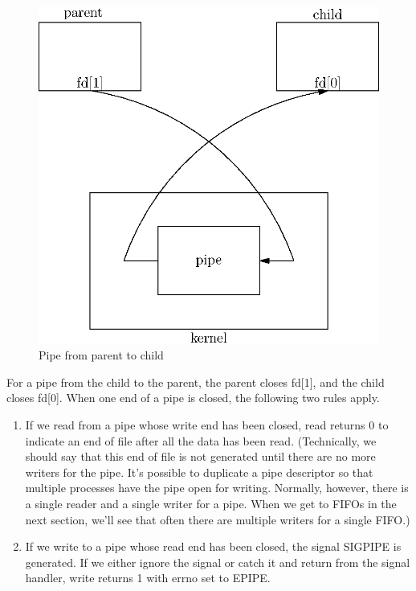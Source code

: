 \begin{figure}[h!]
	\includegraphics[width=\linewidth]{04IpcFifoReader/sample_box.eps}
	\caption{Pipe from parent to child}
\end{figure}
For a pipe from the child to the parent, the parent closes fd[1], and the child closes fd[0]. When one end of a pipe is closed, the following two rules apply.

\begin{enumerate}
	\item If we read from a pipe whose write end has been closed, read returns 0 to indicate an end of file after all the data 		has been read. (Technically, we should say that this end of file is not generated until there are no more writers for the 		pipe. It's possible to duplicate a pipe descriptor so that multiple processes have the pipe open for writing. Normally, 	however, there is a single reader and a single writer for a pipe. When we get to FIFOs in the next section, we'll see that 		often there are multiple writers for a single FIFO.)
	\item If we write to a pipe whose read end has been closed, the signal SIGPIPE is generated. If we either ignore the signal 		or catch it and return from the signal handler, write returns 1 with errno set to EPIPE.
\end{enumerate}

